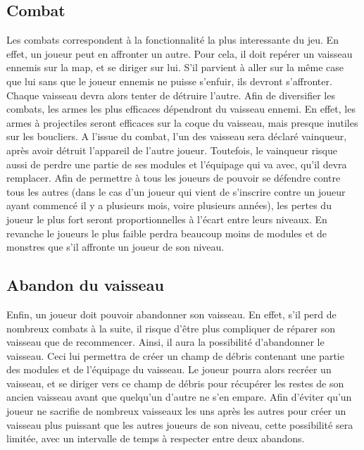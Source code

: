\documentclass[a4paper,11pt]{report}
\begin{document}
    \subsection{Combat}
      Les combats correspondent à la fonctionnalité la plus interessante du jeu. En effet, un joueur peut en affronter un autre.
      Pour cela, il doit repérer un vaisseau ennemis sur la map, et se diriger sur lui. 
      S'il parvient à aller sur la même case que lui sans que le joueur ennemis ne puisse s'enfuir, ils devront s'affronter.
      Chaque vaisseau devra alors tenter de détruire l'autre. Afin de diversifier les combats, les armes les plus efficaces dépendront du vaisseau ennemi.
      En effet, les armes à projectiles seront efficaces sur la coque du vaisseau, mais presque inutiles sur les boucliers.
      A l'issue du combat, l'un des vaisseau sera déclaré vainqueur, après avoir détruit l'appareil de l'autre joueur. 
      Toutefois, le vainqueur risque aussi de perdre une partie de ses modules et l'équipage qui va avec, qu'il devra remplacer.
      Afin de permettre à tous les joueurs de pouvoir se défendre contre tous les autres (dans le cas d'un joueur qui vient de s'inscrire contre un joueur ayant commencé il y a plusieurs mois, voire plusieurs années), les pertes du joueur le plus fort seront proportionnelles à l'écart entre leurs niveaux.
      En revanche le joueurs le plus faible perdra beaucoup moins de modules et de monstres que s'il affronte un joueur de son niveau.
      
    \subsection{Abandon du vaisseau}
      Enfin, un joueur doit pouvoir abandonner son vaisseau. 
      En effet, s'il perd de nombreux combats à la suite, il risque d'être plus compliquer de réparer son vaisseau que de recommencer.
      Ainsi, il aura la possibilité d'abandonner le vaisseau. Ceci lui permettra de créer un champ de débris contenant une partie des modules et de l'équipage du vaisseau.
      Le joueur pourra alors recréer un vaisseau, et se diriger vers ce champ de débris pour récupérer les restes de son ancien vaisseau avant que quelqu'un d'autre ne s'en empare.
      Afin d'éviter qu'un joueur ne sacrifie de nombreux vaisseaux les uns après les autres pour créer un vaisseau plus puissant que les autres joueurs de son niveau, cette possibilité sera limitée, avec un intervalle de temps à respecter entre deux abandons.
\end{document}
